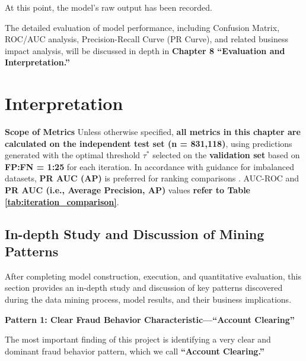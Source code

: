 \documentclass[sigplan,screen]{acmart}
\begin{document}
At this point, the model's raw output has been recorded.

The detailed evaluation of model performance, including Confusion Matrix, ROC/AUC analysis, Precision-Recall Curve (PR Curve), and related business impact analysis, will be discussed in depth in \textbf{Chapter 8 ``Evaluation and Interpretation.''}

\section{Interpretation}

\textbf{Scope of Metrics} Unless otherwise specified, \textbf{all metrics in this chapter are calculated on the independent test set (n = 831,118)}, using predictions generated with the optimal threshold \textbf{$\tau^*$} selected on the \textbf{validation set} based on \textbf{FP:FN = 1:25} for each iteration. In accordance with guidance for imbalanced datasets, \textbf{PR AUC (AP)} is preferred for ranking comparisons \citep{saito2015precision}. AUC-ROC and \textbf{PR AUC (i.e., Average Precision, AP)} values \textbf{refer to Table \ref{tab:iteration_comparison}}.

\subsection{In-depth Study and Discussion of Mining Patterns}

After completing model construction, execution, and quantitative evaluation, this section provides an in-depth study and discussion of key patterns discovered during the data mining process, model results, and their business implications.

\textbf{Pattern 1: Clear Fraud Behavior Characteristic---``Account Clearing''}

The most important finding of this project is identifying a very clear and dominant fraud behavior pattern, which we call \textbf{``Account Clearing.''}
\end{document}
